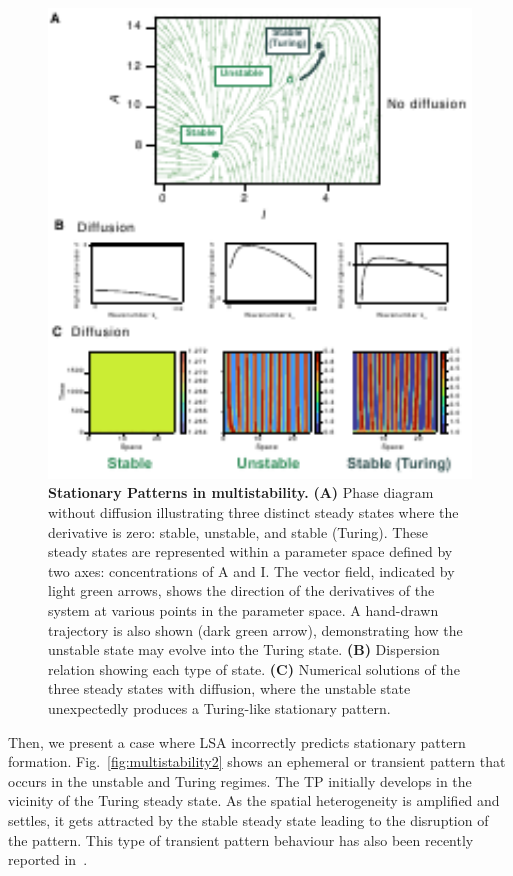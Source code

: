 \begin{figure}[H] %
    \centering
    \begin{adjustbox}{center}
        \includegraphics[width=1\textwidth]{chapters/Chapter 1/multistability1} %
    \end{adjustbox}
    \caption{\textbf{Stationary Patterns in multistability.} \textbf{(A)} Phase diagram without diffusion illustrating three distinct steady states where the derivative is zero: stable, unstable, and stable (Turing). These steady states are represented within a parameter space defined by two axes: concentrations of A and I. The vector field, indicated by light green arrows, shows the direction of the derivatives of the system at various points in the parameter space. A hand-drawn trajectory is also shown (dark green arrow), demonstrating how the unstable state may evolve into the Turing state. \textbf{(B)} Dispersion relation showing each type of state. \textbf{(C)} Numerical solutions of the three steady states with diffusion, where the unstable state unexpectedly produces a Turing-like stationary pattern. }
    \label{fig:multistability1} %
\end{figure}
Then, we present a case where LSA incorrectly predicts stationary pattern formation.
Fig.~\ref{fig:multistability2} shows an ephemeral or transient pattern that occurs in the unstable and Turing regimes.
The TP initially develops in the vicinity of the Turing steady state.
As the spatial heterogeneity is amplified and settles, it gets attracted by the stable steady state leading to the disruption of the pattern.
This type of transient pattern behaviour has also been recently reported in~\cite{Krause2023}.

